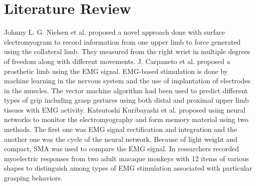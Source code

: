 \documentclass[conference]{IEEEtran}
\begin{document}
\section{Literature Review}
Johnny L. G. Nielsen et al. \cite{nielsen2010simultaneous}  proposed a novel approach done with surface electromyogram to
record information from one upper limb to force generated using the collateral limb. They measured from the right wrist in multiple degrees of freedom along with different movements. J. Carpaneto et al. \cite{6290769} proposed a prosthetic limb using the EMG signal. EMG-based stimulation is done by machine learning in the nervous system and the use of implantation of
electrodes in the muscles. The vector machine algorithm had been used to predict different types of grip including grasp gestures using both distal and proximal upper limb tissues with EMG
activity. Katsutoshi Kuribayashi et al. \cite{407610} proposed using neural networks to monitor the electromyography and form memory material using two methods. The first one was EMG signal
rectification and integration and the another one was the cycle of the neural network. Because of light weight and compact, SMA was used to compare the EMG signal. In  \cite{abc21} researchers recorded myoelectric responses from two adult macaque monkeys with 12 items of various shapes to distinguish among types of EMG stimulation associated with particular grasping behaviors.
\end{document}
